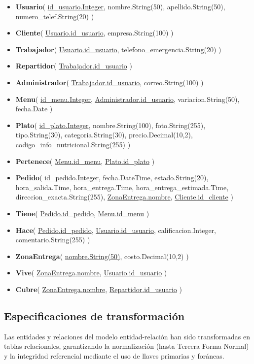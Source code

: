 \documentclass[12pt,a4paper]{article}
\newcommand{\relname}[1]{\textcolor{green!60!black}{#1}}
\newcommand{\attr}[1]{\textcolor{blue!70!black}{#1}}
\newcommand{\rel}[1]{\textbf{\textcolor{green!70!black}{#1}}}
\newcommand{\pk}[1]{\uline{\textcolor{green!60!black}{#1}}}
\newcommand{\fk}[2]{\uline{\relname{#1}.\attr{#2}}}
\begin{document}
\begin{itemize}\setlength\itemsep{0.3em}
  \item \rel{Usuario}(
    \pk{id\_usuario.Integer}, 
    nombre.String(50), 
    apellido.String(50), 
    numero\_telef.String(20)
  )
  \item \rel{Cliente}(
    \fk{Usuario}{id\_usuario}, 
    empresa.String(100)
  )
  \item \rel{Trabajador}(
    \fk{Usuario}{id\_usuario}, 
    telefono\_emergencia.String(20)
  )
  \item \rel{Repartidor}(
    \fk{Trabajador}{id\_usuario}
  )
  \item \rel{Administrador}(
    \fk{Trabajador}{id\_usuario}, 
    correo.String(100)
  )
  \item \rel{Menu}(
    \pk{id\_menu.Integer}, 
    \fk{Administrador}{id\_usuario}, 
    variacion.String(50), 
    fecha.Date
  )
  \item \rel{Plato}(
    \pk{id\_plato.Integer}, 
    nombre.String(100), 
    foto.String(255), 
    tipo.String(30), 
    categoria.String(30), 
    precio.Decimal(10,2),
    codigo\_info\_nutricional.String(255)
  )
  \item \rel{Pertenece}(
    \fk{Menu}{id\_menu}, 
    \fk{Plato}{id\_plato}
  )
  \item \rel{Pedido}(
    \pk{id\_pedido.Integer}, 
    fecha.DateTime, 
    estado.String(20), 
    hora\_salida.Time, 
    hora\_entrega.Time, 
    hora\_entrega\_estimada.Time, 
    direccion\_exacta.String(255), 
    \fk{ZonaEntrega}{nombre},
    \fk{Cliente}{id\_cliente}
  )
  \item \rel{Tiene}(
    \fk{Pedido}{id\_pedido}, 
    \fk{Menu}{id\_menu}
  )
  \item \rel{Hace}(
    \fk{Pedido}{id\_pedido}, 
    \fk{Usuario}{id\_usuario}, 
    calificacion.Integer, 
    comentario.String(255)
  )
  \item \rel{ZonaEntrega}(
    \pk{nombre.String(50)}, 
    costo.Decimal(10,2)
  )
  \item \rel{Vive}(
    \fk{ZonaEntrega}{nombre}, 
    \fk{Usuario}{id\_usuario}
  )
  \item \rel{Cubre}(
    \fk{ZonaEntrega}{nombre}, 
    \fk{Repartidor}{id\_usuario}
  )
\end{itemize}

\subsection{Especificaciones de transformación}
Las entidades y relaciones del modelo entidad-relación han sido transformadas en tablas relacionales, garantizando la normalización (hasta Tercera Forma Normal) y la integridad referencial mediante el uso de llaves primarias y foráneas.
\end{document}
